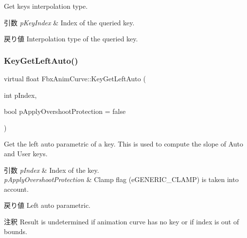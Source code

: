Get key\textquotesingle{}s interpolation type. 
\begin{DoxyParams}{引数}
{\em p\+Key\+Index} & Index of the queried key. \\
\hline
\end{DoxyParams}
\begin{DoxyReturn}{戻り値}
Interpolation type of the queried key. 
\end{DoxyReturn}
\mbox{\label{class_fbx_anim_curve_a1bd66bdbb3e7e798d70695dc97f71dc7}} 
\subsubsection{\texorpdfstring{Key\+Get\+Left\+Auto()}{KeyGetLeftAuto()}}
{\footnotesize\ttfamily virtual float Fbx\+Anim\+Curve\+::\+Key\+Get\+Left\+Auto (\begin{DoxyParamCaption}\item[{int}]{p\+Index,  }\item[{bool}]{p\+Apply\+Overshoot\+Protection = {\ttfamily false} }\end{DoxyParamCaption})\hspace{0.3cm}{\ttfamily [pure virtual]}}

Get the left auto parametric of a key. This is used to compute the slope of Auto and User keys. 
\begin{DoxyParams}{引数}
{\em p\+Index} & Index of the key. \\
\hline
{\em p\+Apply\+Overshoot\+Protection} & Clamp flag (e\+G\+E\+N\+E\+R\+I\+C\+\_\+\+C\+L\+A\+MP) is taken into account. \\
\hline
\end{DoxyParams}
\begin{DoxyReturn}{戻り値}
Left auto parametric. 
\end{DoxyReturn}
\begin{DoxyRemark}{注釈}
Result is undetermined if animation curve has no key or if index is out of bounds. 
\end{DoxyRemark}
\mbox{\label{class_fbx_anim_curve_a9ccab8818487ccaaaf908c5367e3f9e9}} 
